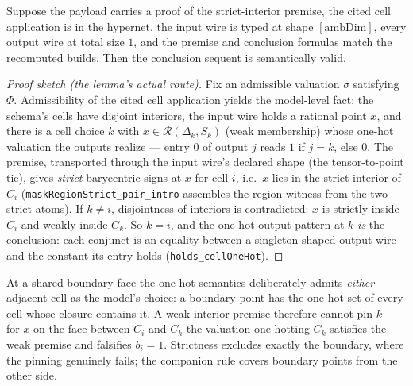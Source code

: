 \begin{bprop}\label{prop:cii-sound}
Suppose the payload carries a proof of the strict-interior premise, the
cited cell application is in the hypernet, the input wire is typed at
shape $[\mathrm{ambDim}]$, every output wire at total size $1$, and the
premise and conclusion formulas match the recomputed builds. Then the
conclusion sequent is semantically valid.
\end{bprop}
\begin{proof}[Proof sketch (the lemma's actual route)]
Fix an admissible valuation $\sigma$ satisfying $\Phi$. Admissibility of
the cited cell application yields the model-level fact: the schema's
cells have disjoint interiors, the input wire holds a rational point
$x$, and there is a cell choice $k$ with $x \in
\mathcal{R}(\Delta_k, S_k)$ (weak membership) whose one-hot valuation
the outputs realize --- entry $0$ of output $j$ reads $1$ if $j = k$,
else $0$. The premise, transported through the input wire's declared
shape (the tensor-to-point tie), gives \emph{strict} barycentric signs
at $x$ for cell $i$, i.e.\ $x$ lies in the strict interior of $C_i$
(\texttt{maskRegionStrict\_pair\_intro} assembles the region witness
from the two strict atoms). If $k \neq i$, disjointness of interiors is
contradicted: $x$ is strictly inside $C_i$ and weakly inside $C_k$. So
$k = i$, and the one-hot output pattern at $k$ \emph{is} the conclusion:
each conjunct is an equality between a singleton-shaped output wire and
the constant its entry holds (\texttt{holds\_cellOneHot}).
\end{proof}

\begin{bremark}\label{rem:cii-strict}
At a shared boundary face the one-hot semantics deliberately admits
\emph{either} adjacent cell as the model's choice: a boundary point has
the one-hot set of every cell whose closure contains it. A weak-interior
premise therefore cannot pin $k$ --- for $x$ on the face between $C_i$
and $C_k$ the valuation one-hotting $C_k$ satisfies the weak premise
and falsifies $b_i = 1$. Strictness excludes exactly the boundary, where
the pinning genuinely fails; the companion rule 
covers boundary points from the other side.
\end{bremark}

